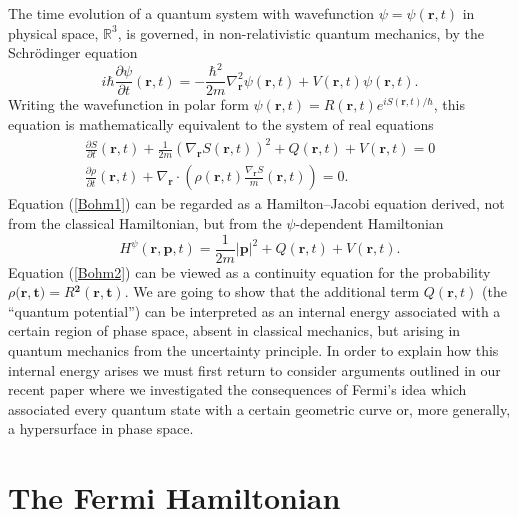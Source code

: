 \documentclass[11pt]{article}%
\begin{document}
The time evolution of a quantum system with wavefunction $\psi=\psi
(\mathbf{r},t)$ in physical space, $\mathbb{R}^{3}$, is governed, in
non-relativistic quantum mechanics, by the Schr\"{o}dinger equation
\begin{equation}
i\hbar\frac{\partial\psi}{\partial t}(\mathbf{r},t)=-\frac{\hbar^{2}}%
{2m}\nabla_{\mathbf{r}}^{2}\psi(\mathbf{r},t)+V(\mathbf{r},t)\psi
(\mathbf{r},t). \label{schr1}%
\end{equation}
Writing the wavefunction in polar form $\psi(\mathbf{r},t)=R(\mathbf{r}%
,t)e^{iS(\mathbf{r},t)/\hbar}$, this equation is mathematically equivalent to
the system of real equations
\begin{gather}
\frac{\partial S}{\partial t}(\mathbf{r},t)+\frac{1}{2m}(\nabla_{\mathbf{r}%
}S(\mathbf{r},t))^{2}+Q(\mathbf{r},t)+V(\mathbf{r},t)=0\label{Bohm1}\\
\frac{\partial\rho}{\partial t}(\mathbf{r},t)+\nabla_{\mathbf{r}}\cdot\left(
\rho(\mathbf{r},t)\frac{\nabla_{\mathbf{r}}S}{m}(\mathbf{r},t)\right)  =0.
\label{Bohm2}%
\end{gather}
Equation (\ref{Bohm1}) can be regarded as a Hamilton--Jacobi equation derived,
not from the classical Hamiltonian, but from the $\psi$-dependent Hamiltonian%
\[
H^{\psi}(\mathbf{r},\mathbf{p},t)=\frac{1}{2m}|\mathbf{p}|^{2}+Q(\mathbf{r}%
,t)+V(\mathbf{r},t)\text{.}%
\]
Equation (\ref{Bohm2}) can be viewed as a continuity equation for the
probability $\rho(\mathbf{r,t)}=R\mathbf{^{2}(r,t)}$. We are going to show
that the additional term $Q(\mathbf{r},t)$ (the \textquotedblleft quantum
potential\textquotedblright) can be interpreted as an internal energy
associated with a certain region of phase space, absent in classical
mechanics, but arising in quantum mechanics from the uncertainty principle. In
order to explain how this internal energy arises we must first return to
consider arguments outlined in our recent paper \cite{degohi14} where we
investigated the consequences of Fermi's idea \cite{Fermi} which associated
every quantum state with a certain geometric curve or, more generally, a
hypersurface in phase space.

\section{The Fermi Hamiltonian}
\end{document}
